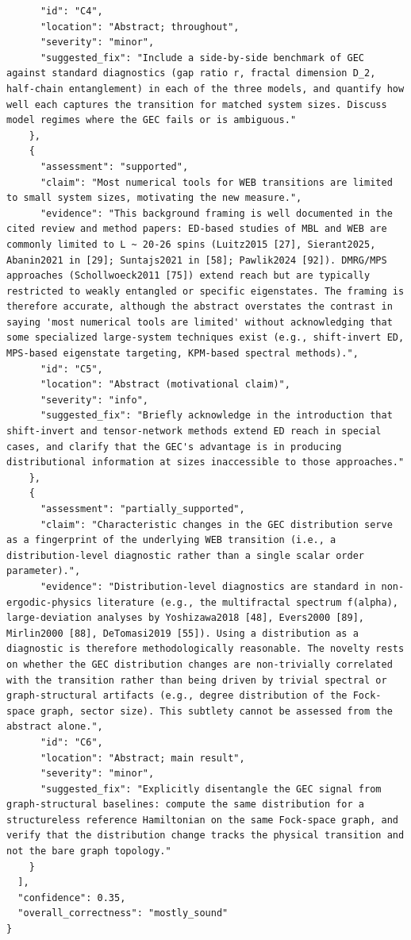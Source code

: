 \documentclass[11pt]{article}
\begin{document}
\begin{verbatim}
      "id": "C4",
      "location": "Abstract; throughout",
      "severity": "minor",
      "suggested_fix": "Include a side-by-side benchmark of GEC against standard diagnostics (gap ratio r, fractal dimension D_2, half-chain entanglement) in each of the three models, and quantify how well each captures the transition for matched system sizes. Discuss model regimes where the GEC fails or is ambiguous."
    },
    {
      "assessment": "supported",
      "claim": "Most numerical tools for WEB transitions are limited to small system sizes, motivating the new measure.",
      "evidence": "This background framing is well documented in the cited review and method papers: ED-based studies of MBL and WEB are commonly limited to L ~ 20-26 spins (Luitz2015 [27], Sierant2025, Abanin2021 in [29]; Suntajs2021 in [58]; Pawlik2024 [92]). DMRG/MPS approaches (Schollwoeck2011 [75]) extend reach but are typically restricted to weakly entangled or specific eigenstates. The framing is therefore accurate, although the abstract overstates the contrast in saying 'most numerical tools are limited' without acknowledging that some specialized large-system techniques exist (e.g., shift-invert ED, MPS-based eigenstate targeting, KPM-based spectral methods).",
      "id": "C5",
      "location": "Abstract (motivational claim)",
      "severity": "info",
      "suggested_fix": "Briefly acknowledge in the introduction that shift-invert and tensor-network methods extend ED reach in special cases, and clarify that the GEC's advantage is in producing distributional information at sizes inaccessible to those approaches."
    },
    {
      "assessment": "partially_supported",
      "claim": "Characteristic changes in the GEC distribution serve as a fingerprint of the underlying WEB transition (i.e., a distribution-level diagnostic rather than a single scalar order parameter).",
      "evidence": "Distribution-level diagnostics are standard in non-ergodic-physics literature (e.g., the multifractal spectrum f(alpha), large-deviation analyses by Yoshizawa2018 [48], Evers2000 [89], Mirlin2000 [88], DeTomasi2019 [55]). Using a distribution as a diagnostic is therefore methodologically reasonable. The novelty rests on whether the GEC distribution changes are non-trivially correlated with the transition rather than being driven by trivial spectral or graph-structural artifacts (e.g., degree distribution of the Fock-space graph, sector size). This subtlety cannot be assessed from the abstract alone.",
      "id": "C6",
      "location": "Abstract; main result",
      "severity": "minor",
      "suggested_fix": "Explicitly disentangle the GEC signal from graph-structural baselines: compute the same distribution for a structureless reference Hamiltonian on the same Fock-space graph, and verify that the distribution change tracks the physical transition and not the bare graph topology."
    }
  ],
  "confidence": 0.35,
  "overall_correctness": "mostly_sound"
}
\end{verbatim}
\end{document}
